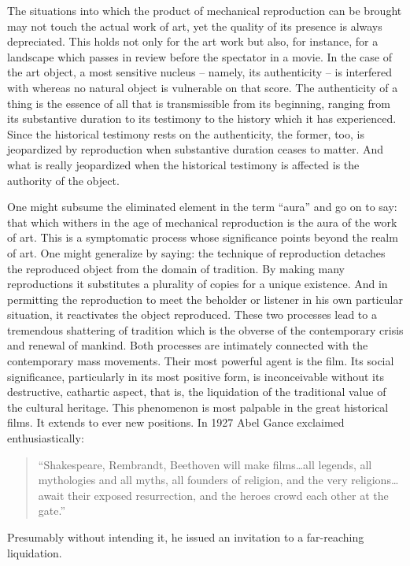 \documentclass{article}
\begin{document}
The situations into which the product of mechanical reproduction can be brought
may not touch the actual work of art, yet the quality of its presence is always
depreciated. This holds not only for the art work but also, for instance, for a
landscape which passes in review before the spectator in a movie. In the case
of the art object, a most sensitive nucleus – namely, its authenticity – is
interfered with whereas no natural object is vulnerable on that score. The
authenticity of a thing is the essence of all that is transmissible from its
beginning, ranging from its substantive duration to its testimony to the
history which it has experienced. Since the historical testimony rests on the
authenticity, the former, too, is jeopardized by reproduction when substantive
duration ceases to matter. And what is really jeopardized when the historical
testimony is affected is the authority of the object.

One might subsume the eliminated element in the term “aura” and go on to say:
that which withers in the age of mechanical reproduction is the aura of the
work of art. This is a symptomatic process whose significance points beyond the
realm of art. One might generalize by saying: the technique of reproduction
detaches the reproduced object from the domain of tradition. By making many
reproductions it substitutes a plurality of copies for a unique existence. And
in permitting the reproduction to meet the beholder or listener in his own
particular situation, it reactivates the object reproduced. These two processes
lead to a tremendous shattering of tradition which is the obverse of the
contemporary crisis and renewal of mankind. Both processes are intimately
connected with the contemporary mass movements. Their most powerful agent is
the film. Its social significance, particularly in its most positive form, is
inconceivable without its destructive, cathartic aspect, that is, the
liquidation of the traditional value of the cultural heritage. This phenomenon
is most palpable in the great historical films. It extends to ever new
positions. In 1927 Abel Gance exclaimed enthusiastically:

\begin{quote}
“Shakespeare, Rembrandt, Beethoven will make films\ldots all legends, all mythologies and all myths, all founders of religion, and the very religions\ldots await their exposed resurrection, and the heroes crowd each other at the gate.”
\end{quote}

Presumably without intending it, he issued an invitation to a far-reaching liquidation.
\end{document}
